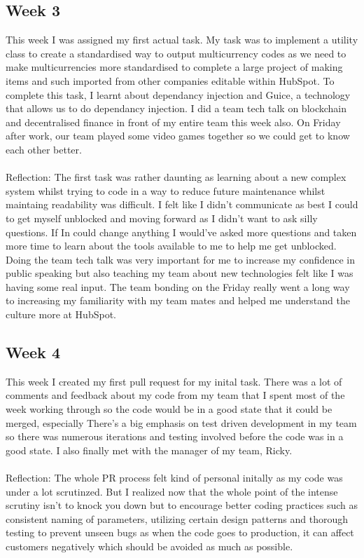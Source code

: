 \documentclass[11pt]{article} %
\begin{document}
\subsection{Week 3}
This week I was assigned my first actual task. My task was to implement a utility class to create a standardised way to output multicurrency codes as we need to make multicurrencies more standardised to complete a large project of making items and such imported from other companies editable within HubSpot. To complete this task, I learnt about dependancy injection and Guice, a technology that allows us to do dependancy injection. I did a team tech talk on blockchain and decentralised finance in front of my entire team this week also. On Friday after work, our team played some video games together so we could get to know each other better.
\\\\
Reflection: The first task was rather daunting as learning about a new complex system whilst trying to code in a way to reduce future maintenance whilst maintaing readability was difficult. I felt like I didn't communicate as best I could to get myself unblocked and moving forward as I didn't want to ask silly questions. If In could change anything I would've asked more questions and taken more time to learn about the tools available to me to help me get unblocked. Doing the team tech talk was very important for me to increase my confidence in public speaking but also teaching my team about new technologies felt like I was having some real input. The team bonding on the Friday really went a long way to increasing my familiarity with my team mates and helped me understand the culture more at HubSpot.
\subsection{Week 4}
This week I created my first pull request for my inital task. There was a lot of comments and feedback about my code from my team that I spent most of the week working through so the code would be in a good state that it could be merged, especially There's a big emphasis on test driven development in my team so there was numerous iterations and testing involved before the code was in a good state. I also finally met with the manager of my team, Ricky. 
\\\\
Reflection: The whole PR process felt kind of personal initally as my code was under a lot scrutinzed. But I realized now that the whole point of the intense scrutiny isn't to knock you down but to encourage better coding practices such as consistent naming of parameters, utilizing certain design patterns and thorough testing to prevent unseen bugs as when the code goes to production, it can affect customers negatively which should be avoided as much as possible. 
\end{document}
